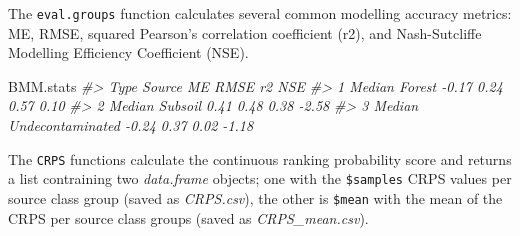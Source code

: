 \documentclass[
]{article}
\newenvironment{Shaded}{\begin{snugshade}}{\end{snugshade}}
\newcommand{\AttributeTok}[1]{\textcolor[rgb]{0.13,0.29,0.53}{#1}}
\newcommand{\CommentTok}[1]{\textcolor[rgb]{0.56,0.35,0.01}{\textit{#1}}}
\newcommand{\FunctionTok}[1]{\textcolor[rgb]{0.13,0.29,0.53}{\textbf{#1}}}
\newcommand{\NormalTok}[1]{#1}
\newcommand{\OtherTok}[1]{\textcolor[rgb]{0.56,0.35,0.01}{#1}}
\newcommand{\SpecialCharTok}[1]{\textcolor[rgb]{0.81,0.36,0.00}{\textbf{#1}}}
\newcommand{\StringTok}[1]{\textcolor[rgb]{0.31,0.60,0.02}{#1}}
\begin{document}
The \texttt{eval.groups} function calculates several common modelling
accuracy metrics: ME, RMSE, squared Pearson's correlation coefficient
(r2), and Nash-Sutcliffe Modelling Efficiency Coefficient (NSE).

\begin{Shaded}
\end{Shaded}

\begin{Shaded}
\begin{Highlighting}[]
\NormalTok{BMM.stats}
\CommentTok{\#\textgreater{}     Type           Source    ME RMSE   r2   NSE}
\CommentTok{\#\textgreater{} 1 Median           Forest {-}0.17 0.24 0.57  0.10}
\CommentTok{\#\textgreater{} 2 Median          Subsoil  0.41 0.48 0.38 {-}2.58}
\CommentTok{\#\textgreater{} 3 Median Undecontaminated {-}0.24 0.37 0.02 {-}1.18}
\end{Highlighting}
\end{Shaded}

The \texttt{CRPS} functions calculate the continuous ranking probability
score and returns a list contraining two \emph{data.frame} objects; one
with the \texttt{\$samples} CRPS values per source class group (saved as
\emph{CRPS.csv}), the other is \texttt{\$mean} with the mean of the CRPS
per source class groups (saved as \emph{CRPS\_mean.csv}).
\end{document}
